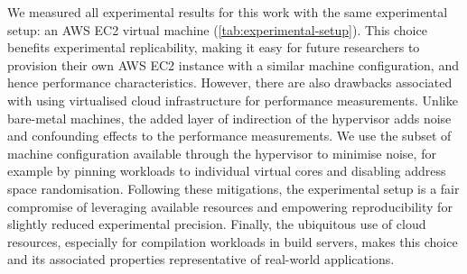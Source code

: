 We measured all experimental results for this work with the same experimental setup: an AWS EC2 virtual machine (\autoref{tab:experimental-setup}).
This choice benefits experimental replicability, making it easy for future researchers to provision their own AWS EC2 instance with a similar machine configuration, and hence performance characteristics.
However, there are also drawbacks associated with using virtualised cloud infrastructure for performance measurements.
Unlike bare-metal machines, the added layer of indirection of the hypervisor adds noise and confounding effects to the performance measurements.
We use the subset of machine configuration available through the hypervisor to minimise noise, for example by pinning workloads to individual virtual cores and disabling address space randomisation. %
Following these mitigations, the experimental setup is a fair compromise of leveraging available resources and empowering reproducibility for slightly reduced experimental precision.
Finally, the ubiquitous use of cloud resources, especially for compilation workloads in build servers, makes this choice and its associated properties representative of real-world applications.


